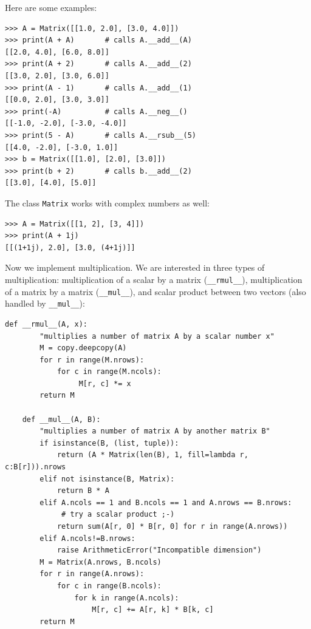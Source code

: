 \documentclass[justified, sixbynine]{tufte-book}
\def\ft{\small\tt}
\theoremstyle{plain}%
\newtheorem * {corollary}{Corollary}
\theoremstyle{definition}
\theoremstyle{remark}
\newtheorem * {remark}{Remark}
\newtheorem * {note}{Note}
\begin{document}
\begin{fullwidth}
Here are some examples:

\begin{lstlisting}[caption={in file: {\ft nlib.py}}]
>>> A = Matrix([[1.0, 2.0], [3.0, 4.0]])
>>> print(A + A)       # calls A.__add__(A)
[[2.0, 4.0], [6.0, 8.0]]
>>> print(A + 2)       # calls A.__add__(2)
[[3.0, 2.0], [3.0, 6.0]]
>>> print(A - 1)       # calls A.__add__(1)
[[0.0, 2.0], [3.0, 3.0]]
>>> print(-A)          # calls A.__neg__()
[[-1.0, -2.0], [-3.0, -4.0]]
>>> print(5 - A)       # calls A.__rsub__(5)
[[4.0, -2.0], [-3.0, 1.0]]
>>> b = Matrix([[1.0], [2.0], [3.0]])
>>> print(b + 2)       # calls b.__add__(2)
[[3.0], [4.0], [5.0]]
\end{lstlisting}

The class {\ft Matrix} works with complex numbers as well:
\begin{lstlisting}[caption={in file: {\ft nlib.py}}]
>>> A = Matrix([[1, 2], [3, 4]])
>>> print(A + 1j)
[[(1+1j), 2.0], [3.0, (4+1j)]]
\end{lstlisting}


Now we implement multiplication. We are interested in three types of multiplication: multiplication of a scalar by a matrix ({\ft \_\_rmul\_\_}), multiplication of a matrix by a matrix ({\ft \_\_mul\_\_}), and scalar product between two vectors (also handled by {\ft \_\_mul\_\_}):

\begin{lstlisting}[caption={in file: {\ft nlib.py}}]
    def __rmul__(A, x):
        "multiplies a number of matrix A by a scalar number x"
        M = copy.deepcopy(A)
        for r in range(M.nrows):
            for c in range(M.ncols):
                 M[r, c] *= x
        return M

    def __mul__(A, B):
        "multiplies a number of matrix A by another matrix B"
        if isinstance(B, (list, tuple)):
            return (A * Matrix(len(B), 1, fill=lambda r, c:B[r])).nrows
        elif not isinstance(B, Matrix):
            return B * A
        elif A.ncols == 1 and B.ncols == 1 and A.nrows == B.nrows:
             # try a scalar product ;-)
            return sum(A[r, 0] * B[r, 0] for r in range(A.nrows))
        elif A.ncols!=B.nrows:
            raise ArithmeticError("Incompatible dimension")
        M = Matrix(A.nrows, B.ncols)
        for r in range(A.nrows):
            for c in range(B.ncols):
                for k in range(A.ncols):
                    M[r, c] += A[r, k] * B[k, c]
        return M
\end{lstlisting}


\end{fullwidth}
\end{document}
